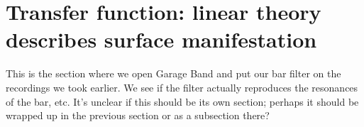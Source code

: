\section{Transfer function: linear theory describes surface manifestation}
\label{sec:transfer_verification}

This is the section where we open Garage Band and put our bar filter on the recordings we took earlier.
We see if the filter actually reproduces the resonances of the bar, etc.
It's unclear if this should be its own section; perhaps it should be wrapped up in the previous section or as a subsection there?


